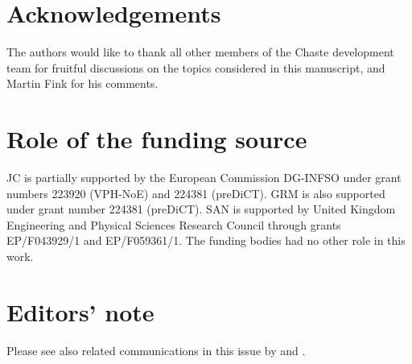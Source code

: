 \documentclass[preprint,authoryear,12pt]{elsarticle}
\begin{document}



\section*{Acknowledgements}
The authors would like to thank all other members of the Chaste development team for fruitful discussions on the topics considered in this manuscript, and Martin Fink for his comments.

\section*{Role of the funding source}

JC is partially supported by the European Commission DG-INFSO under grant numbers 223920 (VPH-NoE) and 224381 (preDiCT).
GRM is also supported under grant number 224381 (preDiCT).
SAN is supported by United Kingdom Engineering and Physical Sciences Research Council through grants EP/F043929/1 and EP/F059361/1.
The funding bodies had no other role in this work.

\section*{Editors' note}

Please see also related communications in this issue by \citet{ednote1} and \citet{ednote2}.



\end{document}
